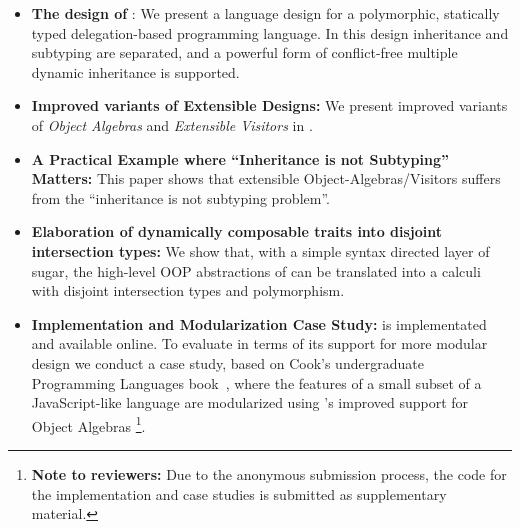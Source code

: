 \begin{itemize}

\item {\bf The design of \name}: We present a language design for a
  polymorphic, statically typed delegation-based programming language.
  In this design inheritance and subtyping are separated, and a
  powerful form of conflict-free multiple dynamic inheritance is supported.

\item {\bf Improved variants of Extensible Designs:} We present
  improved variants of \emph{Object
    Algebras} and \emph{Extensible Visitors} in \name. 

\item {\bf A Practical Example where ``Inheritance is not Subtyping''
    Matters:} This paper shows that extensible Object-Algebras/Visitors
  suffers from the ``inheritance is not subtyping problem''. 

\item {\bf Elaboration of dynamically composable traits into disjoint
    intersection types:} We show that, with a simple syntax
  directed layer of sugar, the high-level OOP abstractions of \name
  can be translated into a calculi with disjoint intersection types and
  polymorphism. 

\item {\bf Implementation and Modularization Case Study:} \name is implementated and
  available online. To evaluate \name in terms of its support for more
  modular design we conduct a case study, based on Cook's
  undergraduate Programming Languages book~\cite{}, where the features
  of a small subset of a JavaScript-like language  are modularized
  using \name's improved support for Object Algebras
  \footnote{{\bf Note to reviewers:} Due
    to the anonymous submission process, the code for the
    implementation and case studies is submitted as supplementary material.}. 

\end{itemize}

\begin{comment}

\paragraph{\bf JavaScript-style Mixin-Based Programming}
A common programming pattern in JavaScript is based on a variant of
Mixins. This programming style is very flexible and enables forms 
of reuse not usually available in more statically typed languages like Java.
However, mixins in JavaScript fundamentally rely on an \emph{object-level composition}
operator for inheritance~\cite{}. This requires a very dynamic form of
inheritance/delegation that is not available in most class-based 
statically-typed OO languages. Ideally the essence of such 
form of mixins should be capturable in statically-typed languages. 
Languages such as TypeScript do attempt to provide better static
type-checking support for those patterns. However, as recently illustrated 
by the work of \citet{alpuimdisjoint}, there are several issues with such an
approach, including type-unsoundness!

\end{comment}